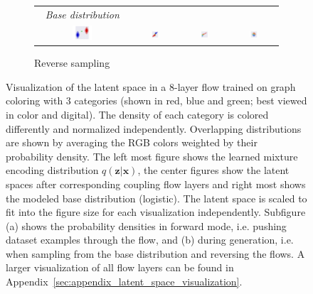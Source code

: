 \begin{figure}[t!]
\begin{subfigure}{\textwidth}
\begin{tabular}{cccc}
            \textit{Base distribution} \\
            \includegraphics[width=0.225\textwidth]{figures/experiments_figures/latent_space/graph_coloring/layer_reverse_26.pdf} & 
            \includegraphics[width=0.225\textwidth]{figures/experiments_figures/latent_space/graph_coloring/layer_reverse_14.pdf}  & 
            \includegraphics[width=0.225\textwidth]{figures/experiments_figures/latent_space/graph_coloring/layer_reverse_08.pdf}  & 
            \includegraphics[width=0.225\textwidth]{figures/experiments_figures/latent_space/graph_coloring/layer_reverse_02.pdf}
            \\
        \end{tabular}
        \caption{Reverse sampling\\[0.2cm]}
        \label{fig:experiments_discussion_latent_space_graph_coloring_reverse}
    \end{subfigure}
    \caption[Latent space of graph coloring flow]{Visualization of the latent space in a 8-layer flow trained on graph coloring with 3 categories (shown in red, blue and green; best viewed in color and digital). The density of each category is colored differently and normalized independently. Overlapping distributions are shown by averaging the RGB colors weighted by their probability density. The left most figure shows the learned mixture encoding distribution $q(\bm{z}|\bm{x})$, the center figures show the latent spaces after corresponding coupling flow layers and right most shows the modeled base distribution (logistic). The latent space is scaled to fit into the figure size for each visualization independently. Subfigure (a) shows the probability densities in forward mode, i.e. pushing dataset examples through the flow, and (b) during generation, i.e. when sampling from the base distribution and reversing the flows.
    A larger visualization of all flow layers can be found in Appendix~\ref{sec:appendix_latent_space_visualization}.}
    \label{fig:experiments_discussion_latent_space_graph_coloring}
\end{figure}

